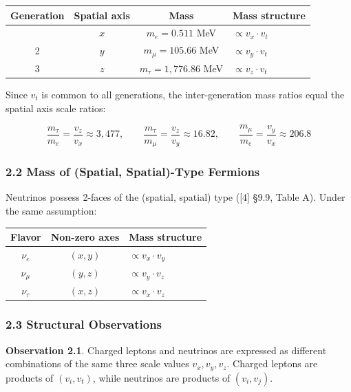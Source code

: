 \documentclass[
  a4paper,11pt]{article}
\newcounter{none}
\theoremstyle{definition}
\theoremstyle{remark}
\begin{document}
{\def\LTcaptype{none} %
\begin{longtable}[]{@{}cccl@{}}
\toprule\noalign{}
Generation & Spatial axis & Mass & Mass structure \\
\midrule\noalign{}
\endhead
\bottomrule\noalign{}
\endlastfoot
1 & \(x\) & \(m_e = 0.511\) MeV & \(\propto v_x \cdot v_t\) \\
2 & \(y\) & \(m_\mu = 105.66\) MeV & \(\propto v_y \cdot v_t\) \\
3 & \(z\) & \(m_\tau = 1{,}776.86\) MeV & \(\propto v_z \cdot v_t\) \\
\end{longtable}
}

Since \(v_t\) is common to all generations, the inter-generation mass
ratios equal the spatial axis scale ratios:

\[\frac{m_\tau}{m_e} = \frac{v_z}{v_x} \approx 3{,}477, \qquad \frac{m_\tau}{m_\mu} = \frac{v_z}{v_y} \approx 16.82, \qquad \frac{m_\mu}{m_e} = \frac{v_y}{v_x} \approx 206.8\]

\subsubsection{2.2 Mass of (Spatial, Spatial)-Type
Fermions}\label{mass-of-spatial-spatial-type-fermions}

Neutrinos possess 2-faces of the (spatial, spatial) type ({[}4{]} §9.9,
Table A). Under the same assumption:

{\def\LTcaptype{none} %
\begin{longtable}[]{@{}ccl@{}}
\toprule\noalign{}
Flavor & Non-zero axes & Mass structure \\
\midrule\noalign{}
\endhead
\bottomrule\noalign{}
\endlastfoot
\(\nu_e\) & \((x, y)\) & \(\propto v_x \cdot v_y\) \\
\(\nu_\mu\) & \((y, z)\) & \(\propto v_y \cdot v_z\) \\
\(\nu_\tau\) & \((x, z)\) & \(\propto v_x \cdot v_z\) \\
\end{longtable}
}

\subsubsection{2.3 Structural
Observations}\label{structural-observations}

\textbf{Observation 2.1}. Charged leptons and neutrinos are expressed as
different combinations of the same three scale values \(v_x, v_y, v_z\).
Charged leptons are products of \((v_i, v_t)\), while neutrinos are
products of \((v_i, v_j)\).
\end{document}
